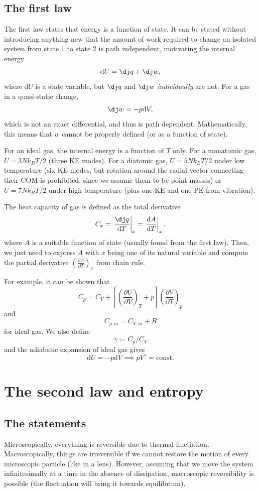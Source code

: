 \documentclass{article}
\theoremstyle{nonumberplain}
\begin{document}
\subsection{The first law}
The first law states that energy is a function of state. It can be stated without introducing anything new that the amount of work required to change an isolated system from state 1 to state 2 is path independent, motivating the internal energy 
\[
    \mathrm{d} U = \mathrm{\dj} q + \dj w,  
\]
where $\mathrm{d} U$ is a state variable, but $\dj q$ and $\dj w$ \textit{individually} are not. For a gas in a quasi-static change, 
\[
    \dj w = - p \mathrm{d} V,
\]
which is not an exact differential, and thus is path dependent. Mathematically, this means that $w$ cannot be properly defined (or as a function of state).

For an ideal gas, the internal energy is a function of $T$ only. For a monatomic gas, $U = 3 N k_B T /2$ (three KE modes). For a diatomic gas, $U = 5 N k_B T /2$ under low temperature (six KE modes, but rotation around the radial vector connecting their COM is prohibited, since we assume them to be point masses) or $U = 7 N k_B T /2$ under high temperature (plus one KE and one PE from vibration). 

The heat capacity of gas is defined as the total derivative
\[
    C_x = \left. \frac{\dj q}{\mathrm{d}T} \right \vert_x = \left. \frac{\mathrm{d}A}{\mathrm{d}T} \right \vert_x, 
\]
where $A$ is a suitable function of state (usually found from the first law). Then, we just need to express $A$ with $x$ being one of its natural variable and compute the partial derivative 
\(
    \left( \frac{\partial A}{\partial T} \right)_{x} 
\)
from chain rule. 

For example, it can be shown that
\[
    C_p = C_V + \left[ \left( \frac{\partial U}{\partial V} \right)_{T} + p\right] \left( \frac{\partial V}{\partial T} \right)_{p} 
\]
and 
\[
    C_{p,m} = C_{V,m} + R
\]
for ideal gas. 
We also define
\[
    \gamma \coloneqq C_p / C_V
\]
and the adiabatic expansion of ideal gas gives 
\[
    \mathrm{d} U = -p \mathrm{d} V \implies 
    p V^\gamma  = \mathrm{const}. 
\]

\section{The second law and entropy}
\subsection{The statements}
Microscopically, everything is reversible due to thermal fluctiation. Macroscopically, things are irreversible if we cannot restore the motion of every microscopic particle (like in a lens). However, assuming that we move the system infinitesimally at a time in the absence of dissipation, macroscopic reversibility is possible (the fluctuation will bring it towards equilibrium). 
\end{document}
